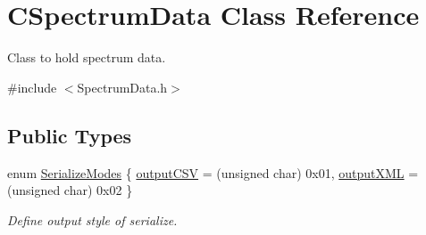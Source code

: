 \hypertarget{classCSpectrumData}{
\section{CSpectrumData Class Reference}
\label{classCSpectrumData}
}


Class to hold spectrum data.  




{\ttfamily \#include $<$SpectrumData.h$>$}

\subsection*{Public Types}
\begin{DoxyCompactItemize}
\item 
enum \hyperlink{classCSpectrumData_aa387f7d2542863db15d57173f83fa359}{SerializeModes} \{ \hyperlink{classCSpectrumData_aa387f7d2542863db15d57173f83fa359a7449377cd31a13eb20d057072a195aeb}{outputCSV} =  (unsigned char) 0x01, 
\hyperlink{classCSpectrumData_aa387f7d2542863db15d57173f83fa359a18b57f288fc3c5e9c4984d7873d9266c}{outputXML} =  (unsigned char) 0x02
 \}
\begin{DoxyCompactList}\small\item\em Define output style of serialize. \item\end{DoxyCompactList}\end{DoxyCompactItemize}
